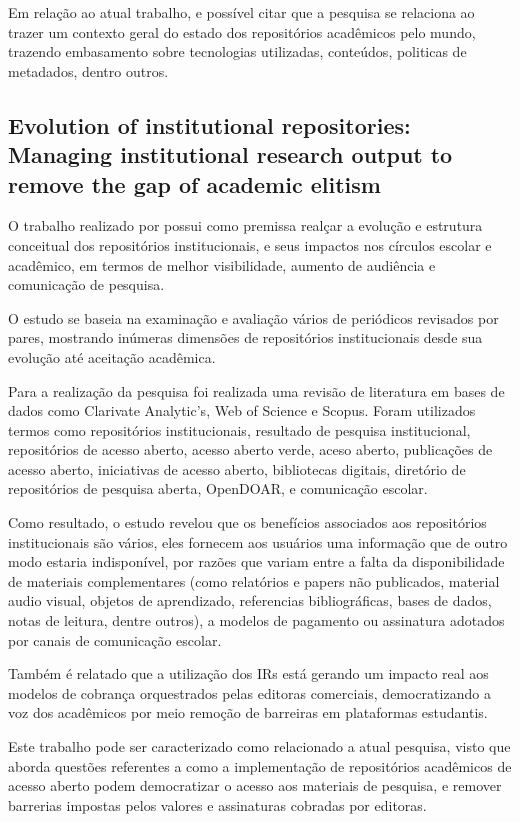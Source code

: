 Em relação ao atual trabalho, e possível citar que a pesquisa se relaciona
ao trazer um contexto geral do estado dos repositórios acadêmicos pelo
mundo, trazendo embasamento sobre tecnologias utilizadas, conteúdos, politicas
de metadados, dentro outros.

\subsection{Evolution of institutional repositories: Managing institutional research output to remove the gap of academic elitism}

O trabalho realizado por \cite{2021:Bashir} possui como premissa realçar a
evolução e estrutura conceitual dos repositórios institucionais, e seus impactos
nos círculos escolar e acadêmico, em termos de melhor visibilidade, aumento
de audiência e comunicação de pesquisa.

O estudo se baseia na examinação
e avaliação vários de periódicos revisados por pares, mostrando inúmeras
dimensões de repositórios institucionais desde sua evolução até aceitação
acadêmica.

Para a realização da pesquisa foi realizada uma revisão de literatura
em bases de dados como Clarivate Analytic’s, Web of Science e Scopus.
Foram utilizados termos como repositórios institucionais, resultado de
pesquisa institucional, repositórios de acesso aberto, acesso aberto verde,
aceso aberto, publicações de acesso aberto, iniciativas de acesso aberto,
bibliotecas digitais, diretório de repositórios de pesquisa aberta,
OpenDOAR, e comunicação escolar.

Como resultado, o estudo revelou que os benefícios associados aos
repositórios institucionais são vários, eles fornecem aos usuários
uma informação que de outro modo estaria indisponível, por razões que
variam entre a falta da disponibilidade de materiais complementares
(como relatórios e papers não publicados, material audio visual,
objetos de aprendizado, referencias bibliográficas, bases de dados,
notas de leitura, dentre outros), a modelos de pagamento ou assinatura
adotados por canais de comunicação escolar.

Também é relatado que a utilização dos IRs está gerando um impacto real
aos modelos de cobrança orquestrados pelas editoras comerciais,
democratizando a voz dos acadêmicos por meio remoção de barreiras
em plataformas estudantis.

Este trabalho pode ser caracterizado como relacionado a atual pesquisa,
visto que aborda questões referentes a como a implementação de repositórios
acadêmicos de acesso aberto podem democratizar o acesso aos materiais de
pesquisa, e remover barrerias impostas pelos valores e assinaturas
cobradas por editoras.

